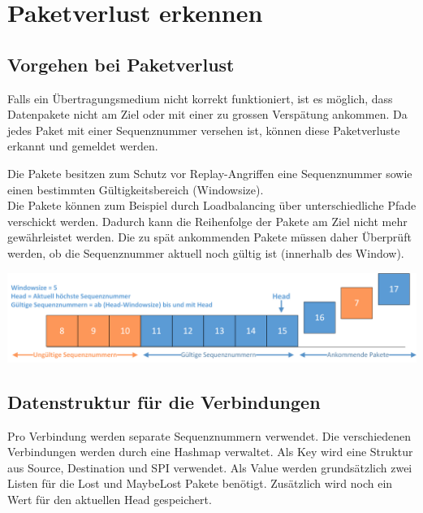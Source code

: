 \section{Paketverlust erkennen}
\label{sec:Paketverlust erkennen}

\subsection{Vorgehen bei Paketverlust}

Falls ein Übertragungsmedium nicht korrekt funktioniert, ist es möglich, dass Datenpakete nicht am Ziel oder mit einer zu grossen Verspätung ankommen.
Da jedes \esp{} Paket mit einer Sequenznummer versehen ist, können diese Paketverluste erkannt und gemeldet werden.

Die \esp{} Pakete besitzen zum Schutz vor Replay-Angriffen eine Sequenznummer sowie einen bestimmten Gültigkeitsbereich (Windowsize).\\
Die Pakete können zum Beispiel durch Loadbalancing \"{u}ber unterschiedliche Pfade verschickt werden. Dadurch kann die Reihenfolge der Pakete am Ziel nicht mehr gewährleistet werden. Die zu spät ankommenden Pakete müssen daher Überprüft werden, ob die Sequenznummer aktuell noch gültig ist (innerhalb des Window).


\includegraphics[width=1\textwidth]{start/img/Sequenznummern.png}

\subsection{Datenstruktur für die \esp Verbindungen}
Pro Verbindung werden separate Sequenznummern verwendet. Die verschiedenen Verbindungen werden durch eine Hashmap verwaltet. Als Key wird eine Struktur aus Source, Destination und \acs{SPI} verwendet. Als Value werden grundsätzlich zwei Listen für die Lost und MaybeLost Pakete benötigt. Zusätzlich wird noch ein Wert für den aktuellen Head gespeichert.


